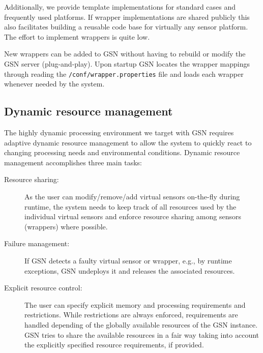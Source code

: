 Additionally, we provide template implementations for standard cases and
frequently used platforms. If wrapper implementations are shared publicly this
also facilitates building a reusable code base for virtually any sensor
platform. The effort to implement wrappers is quite low.

New wrappers can be added to GSN without having to rebuild or modify the GSN
server (plug-and-play). Upon startup GSN locates the wrapper mappings through reading
the \texttt{/conf/wrapper.properties} file and loads each wrapper whenever needed by the system.


\subsection{Dynamic resource management}
\label{sec:dynam-reso-manag}

The highly dynamic processing environment we target with GSN requires adaptive
dynamic resource management to allow the system to quickly react to changing
processing needs and environmental conditions. Dynamic resource management
accomplishes three main tasks:

\begin{description}
\item[Resource sharing:] As the user can modify/remove/add virtual sensors
  on-the-fly during runtime, the system needs to keep track of all resources
  used by the individual virtual sensors and enforce resource sharing among
  sensors (wrappers) where possible.
\item[Failure management:] If GSN detects a faulty virtual sensor or wrapper,
    e.g., by runtime exceptions, GSN undeploys it and releases the associated
    resources. 
  \item[Explicit resource control:] The user can specify explicit memory and
    processing requirements and restrictions. While restrictions are always
    enforced, requirements are handled depending of the globally available
    resources of the GSN instance. GSN tries to share the available resources
    in a fair way taking into account the explicitly specified resource
    requirements, if provided.
\end{description}

